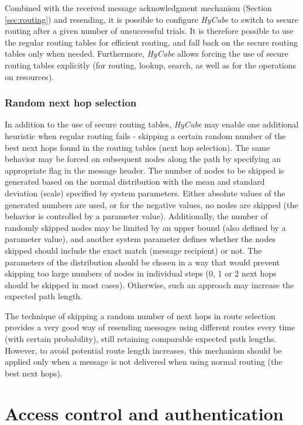 Combined with the received message acknowledgment mechanism (Section \ref{sec:routing}) and resending, it is possible to configure \emph{HyCube} to switch to secure routing after a given number of unsuccessful trials. It is therefore possible to use the regular routing tables for efficient routing, and fall back on the secure routing tables only when needed. Furthermore, \emph{HyCube} allows forcing the use of secure routing tables explicitly (for routing, lookup, search, as well as for the operations on resources).



\subsubsection{Random next hop selection}

In addition to the use of secure routing tables, \emph{HyCube} may enable one additional heuristic when regular routing fails - skipping a certain random number of the best next hops found in the routing tables (next hop selection). The same behavior may be forced on subsequent nodes along the path by specifying an appropriate flag in the message header. The number of nodes to be skipped is generated based on the normal distribution with the mean and standard deviation (scale) specified by system parameters. Either absolute values of the generated numbers are used, or for the negative values, no nodes are skipped (the behavior is controlled by a parameter value). Additionally, the number of randomly skipped nodes may be limited by an upper bound (also defined by a parameter value), and another system parameter defines whether the nodes skipped should include the exact match (message recipient) or not. The parameters of the distribution should be chosen in a way that would prevent skipping too large numbers of nodes in individual steps (0, 1 or 2 next hops should be skipped in most cases). Otherwise, such an approach may increase the expected path length.

The technique of skipping a random number of next hops in route selection provides a very good way of resending messages using different routes every time (with certain probability), still retaining comparable expected path lengths. However, to avoid potential route length increases, this mechanism should be applied only when a message is not delivered when using normal routing (the best next hops).





\section{Access control and authentication}
\label{sec:accessControlAuthentication}

